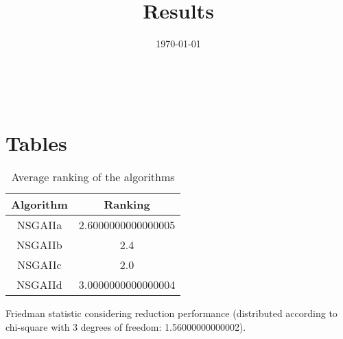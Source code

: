 \documentclass{article}
\title{Results}
\author{}
\date{\today}
\begin{document}
\oddsidemargin 0in \topmargin 0in\maketitle
\
\section{Tables}
\begin{table}[!htp]
\centering
\caption{Average ranking of the algorithms}
\begin{tabular}{c|c}
Algorithm&Ranking\\
\hline
NSGAIIa&2.6000000000000005\\
NSGAIIb&2.4\\
NSGAIIc&2.0\\
NSGAIId&3.0000000000000004\\
\end{tabular}
\end{table}


Friedman statistic considering reduction performance (distributed according to chi-square with 3 degrees of freedom: 1.56000000000002).
\end{document}
